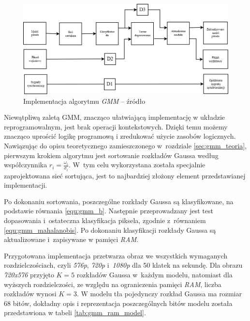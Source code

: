 	\begin{figure}[h!]
		\centering
		\includegraphics[scale=0.45]{img/4/gmm.png}
		\caption{Implementacja algorytmu \textit{GMM} -- źródło \cite{piszczek_15}}
		\label{fig:gmm_diagram}
	\end{figure}
	
Niewątpliwą zaletą GMM, znacząco ułatwiającą implementację w układzie reprogramowalnym, jest brak operacji kontekstowych. 
Dzięki temu możemy znacząco uprościć logikę programową i zredukować użycie zasobów logicznych. 
Nawiązując do opisu teoretycznego zamieszczonego w~rozdziale \ref{sec:gmm_teoria}, pierwszym krokiem algorytmu jest sortowanie rozkładów Gaussa według współczynnika $r_i = \frac{\omega_i}{\sigma_i}$. 
W~tym celu wykorzystana została specjalnie zaprojektowana sieć sortująca, jest to najbardziej złożony element przedstawianej implementacji. 

Po dokonaniu sortowania, poszczególne rozkłady Gaussa są klasyfikowane, na podstawie równania \ref{equ:gmm_b}. 
Następnie przeprowadzany jest test dopasowania i~ostateczna klasyfikacja piksela, zgodnie z~równaniem \ref{equ:gmm_mahalanobis}. 
Po dokonaniu klasyfikacji rozkłady Gaussa są aktualizowane i~zapisywane w pamięci \textit{RAM}.

Przygotowana implementacja przetwarza obraz we wszystkich wymaganych rozdzielczościach, czyli \textit{576p}, \textit{720p} i~\textit{1080p} dla 50 klatek na sekundę. 
Dla obrazu \textit{720x576} przyjęto $K=5$ rozkładów Gaussa w~każdym modelu, natomiast dla wyższych rozdzielczości, ze względu na ograniczenia pamięci \textit{RAM}, liczba rozkładów wynosi $K=3$. 
W modelu tła pojedynczy rozkład Gaussa ma rozmiar $68$ bitów, dokładny opis i reprezentacja poszczególnych bitów modelu została przedstawiona w tabeli \ref{tab:gmm_ram_model}.

